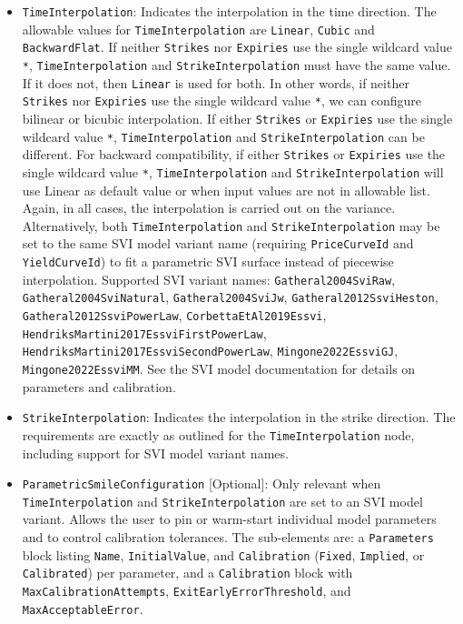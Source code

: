\begin{itemize}
\item \lstinline!TimeInterpolation!:
Indicates the interpolation in the time direction. The allowable values for \lstinline!TimeInterpolation! are \lstinline!Linear!, \lstinline!Cubic! and \lstinline!BackwardFlat!. If neither \lstinline!Strikes! nor \lstinline!Expiries! use the single wildcard value \lstinline!*!, \lstinline!TimeInterpolation! and \lstinline!StrikeInterpolation! must have the same value. If it does not, then \lstinline!Linear! is used for both. In other words, if neither \lstinline!Strikes! nor \lstinline!Expiries! use the single wildcard value \lstinline!*!, we can configure bilinear or bicubic interpolation. If either \lstinline!Strikes! or \lstinline!Expiries! use the single wildcard value \lstinline!*!, \lstinline!TimeInterpolation! and \lstinline!StrikeInterpolation! can be different. For backward compatibility, if either \lstinline!Strikes! or \lstinline!Expiries! use the single wildcard value \lstinline!*!, \lstinline!TimeInterpolation! and \lstinline!StrikeInterpolation! will use Linear as default value or when input values are not in allowable list. Again, in all cases, the interpolation is carried out on the variance.
Alternatively, both \lstinline!TimeInterpolation! and \lstinline!StrikeInterpolation! may be set to the same SVI model variant name (requiring \lstinline!PriceCurveId! and \lstinline!YieldCurveId!) to fit a parametric SVI surface instead of piecewise interpolation. Supported SVI variant names: \lstinline!Gatheral2004SviRaw!, \lstinline!Gatheral2004SviNatural!, \lstinline!Gatheral2004SviJw!, \lstinline!Gatheral2012SsviHeston!, \lstinline!Gatheral2012SsviPowerLaw!, \lstinline!CorbettaEtAl2019Essvi!, \lstinline!HendriksMartini2017EssviFirstPowerLaw!, \lstinline!HendriksMartini2017EssviSecondPowerLaw!, \lstinline!Mingone2022EssviGJ!, \lstinline!Mingone2022EssviMM!. See the SVI model documentation for details on parameters and calibration.

\item \lstinline!StrikeInterpolation!:
Indicates the interpolation in the strike direction. The requirements are exactly as outlined for the \lstinline!TimeInterpolation! node, including support for SVI model variant names.

\item \lstinline!ParametricSmileConfiguration! [Optional]:
Only relevant when \lstinline!TimeInterpolation! and \lstinline!StrikeInterpolation! are set to an SVI model variant. Allows the user to pin or warm-start individual model parameters and to control calibration tolerances. The sub-elements are: a \lstinline!Parameters! block listing \lstinline!Name!, \lstinline!InitialValue!, and \lstinline!Calibration! (\lstinline!Fixed!, \lstinline!Implied!, or \lstinline!Calibrated!) per parameter, and a \lstinline!Calibration! block with \lstinline!MaxCalibrationAttempts!, \lstinline!ExitEarlyErrorThreshold!, and \lstinline!MaxAcceptableError!.


\end{itemize}
